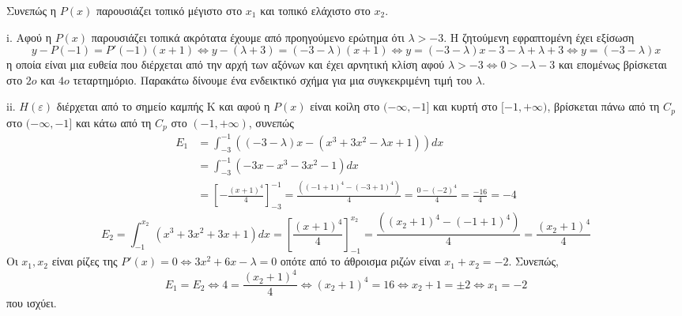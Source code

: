 \begin{alist}
Συνεπώς η $P(x)$ παρουσιάζει τοπικό μέγιστο στο $x_1$ και τοπικό ελάχιστο στο $x_2$. 
\begin{rlist}
\item [i.] Αφού η $P(x)$ παρουσιάζει τοπικά ακρότατα έχουμε από προηγούμενο ερώτημα ότι $\lambda>-3$.
Η ζητούμενη εφραπτομένη έχει εξίσωση
\[ y-P(-1) = P'(-1)(x+1) \Leftrightarrow y-(\lambda+3) = (-3-\lambda)(x+1) \Leftrightarrow y = (-3-\lambda)x -3-\lambda + \lambda + 3 \Leftrightarrow y = (-3-\lambda)x \]
η οποία είναι μια ευθεία που διέρχεται από την αρχή των αξόνων και έχει αρνητική κλίση αφού $\lambda>-3 \Leftrightarrow 0>-\lambda-3$ και επομένως βρίσκεται στο $2ο$ και $4ο$ τεταρτημόριο.
Παρακάτω δίνουμε ένα ενδεικτικό σχήμα για μια συγκεκριμένη τιμή του $\lambda$.
\begin{figure}
\end{figure}
\item [ii.] $H(\varepsilon)$ διέρχεται από το σημείο καμπής K και αφού η $P(x)$ είναι κοίλη στο $(-\infty, -1]$ και κυρτή στο $[-1, +\infty)$, βρίσκεται πάνω από τη $C_p$ στο $(-\infty, -1]$ και κάτω από τη $C_p$ στο $(-1, +\infty)$, συνεπώς
\begin{align*}
E_1 &= \int_{-3}^{-1} (( -3-\lambda)x - (x^3+3x^2-\lambda x+1) ) dx \\
    &= \int_{-3}^{-1} (-3x-x^3-3x^2-1) dx \\
    &= \left[ -\frac{(x+1)^4}{4} \right]_{-3}^{-1} = \frac{((-1+1)^4 - (-3+1)^4)}{4} = \frac{0 - (-2)^4}{4} = \frac{-16}{4} = -4
\end{align*}
\[
E_2 = \int_{-1}^{x_2} (x^3+3x^2+3x+1) dx = \left[ \frac{(x+1)^4}{4} \right]_{-1}^{x_2} = \frac{((x_2+1)^4 - (-1+1)^4)}{4} = \frac{(x_2+1)^4}{4}
\]
Οι $x_1, x_2$ είναι ρίζες της $P'(x)=0 \Leftrightarrow 3x^2+6x-\lambda=0$ οπότε από το άθροισμα ριζών είναι $x_1+x_2 = -2$. Συνεπώς,
\[ E_1 = E_2 \Leftrightarrow 4 = \frac{(x_2+1)^4}{4} \Leftrightarrow (x_2+1)^4 = 16 \Leftrightarrow x_2+1 = \pm 2 \Leftrightarrow x_1=-2 \]
που ισχύει. 
\end{rlist}
\end{alist}


